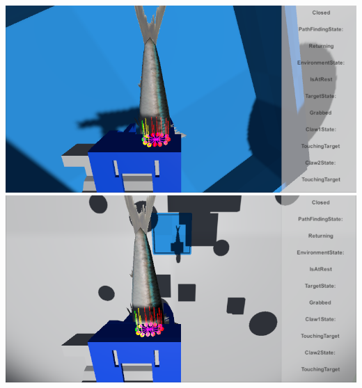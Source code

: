 \includegraphics[width=\linewidth]{figures/simulation/grabbed}
\includegraphics[width=\linewidth]{figures/simulation/returning}